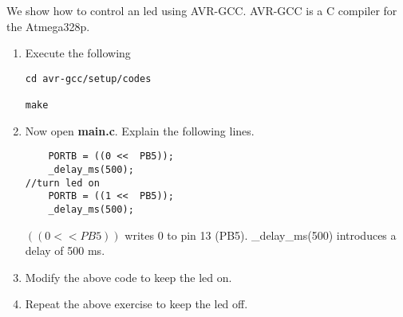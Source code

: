 We show how to control an led using AVR-GCC. AVR-GCC
is a C compiler for the Atmega328p.
\begin{enumerate}[label=\arabic*.,ref=\theenumi]
\item Execute the following
\begin{lstlisting}
cd avr-gcc/setup/codes

make
\end{lstlisting}

\item Now open \textbf{main.c}. Explain the following lines.
\begin{lstlisting}
    PORTB = ((0 <<  PB5));
	_delay_ms(500);
//turn led on
    PORTB = ((1 <<  PB5));
    _delay_ms(500);
\end{lstlisting}
\solution $((0 <<  PB5))$ writes 0 to pin 13 (PB5).  \_delay\_ms(500) introduces a delay of 500 ms.  
\item Modify the above code to keep the led on.
\item Repeat the above exercise to keep the led off.

\end{enumerate}


